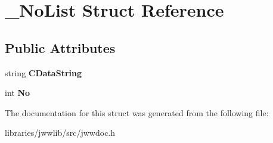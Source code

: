 \hypertarget{struct__NoList}{\section{\-\_\-\-No\-List Struct Reference}
\label{struct__NoList}
}
\subsection*{Public Attributes}
\begin{DoxyCompactItemize}
\item 
\hypertarget{struct__NoList_ad2c9b160eadf11a95f309d838e592442}{string {\bfseries C\-Data\-String}}\label{struct__NoList_ad2c9b160eadf11a95f309d838e592442}

\item 
\hypertarget{struct__NoList_aed6667251abec847ae8a3cfdbff5bfcc}{int {\bfseries No}}\label{struct__NoList_aed6667251abec847ae8a3cfdbff5bfcc}

\end{DoxyCompactItemize}


The documentation for this struct was generated from the following file\-:\begin{DoxyCompactItemize}
\item 
libraries/jwwlib/src/jwwdoc.\-h\end{DoxyCompactItemize}
